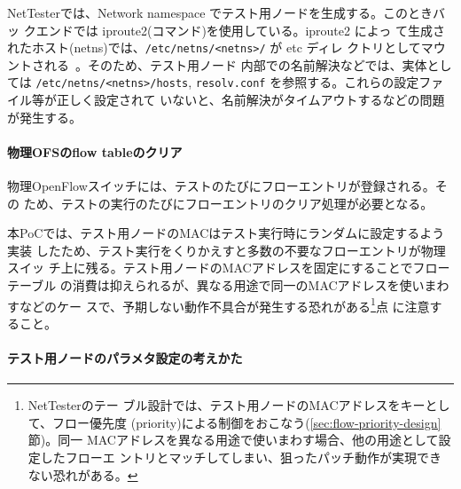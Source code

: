 NetTesterでは、Network namespace でテスト用ノードを生成する。このときバッ
クエンドでは iproute2(コマンド)を使用している。iproute2 によっ
て生成されたホスト(netns)では、\verb|/etc/netns/<netns>/| が etc ディレ
クトリとしてマウントされる~\cite{iproute2-doc}。そのため、テスト用ノード
内部での名前解決などでは、実体としては \verb|/etc/netns/<netns>/hosts|,
\verb|resolv.conf| を参照する。これらの設定ファイル等が正しく設定されて
いないと、名前解決がタイムアウトするなどの問題が発生する。

    \paragraph{物理OFSのflow tableのクリア}
物理OpenFlowスイッチには、テストのたびにフローエントリが登録される。その
ため、テストの実行のたびにフローエントリのクリア処理が必要となる。

本PoCでは、テスト用ノードのMACはテスト実行時にランダムに設定するよう実装
したため、テスト実行をくりかえすと多数の不要なフローエントリが物理スイッ
チ上に残る。テスト用ノードのMACアドレスを固定にすることでフローテーブル
の消費は抑えられるが、異なる用途で同一のMACアドレスを使いまわすなどのケー
スで、予期しない動作不具合が発生する恐れがある\footnote{NetTesterのテー
ブル設計では、テスト用ノードのMACアドレスをキーとして、フロー優先度
(priority)による制御をおこなう(\ref{sec:flow-priority-design}節)。同一
MACアドレスを異なる用途で使いまわす場合、他の用途として設定したフローエ
ントリとマッチしてしまい、狙ったパッチ動作が実現できない恐れがある。}点
に注意すること。

    \paragraph{テスト用ノードのパラメタ設定の考えかた}

